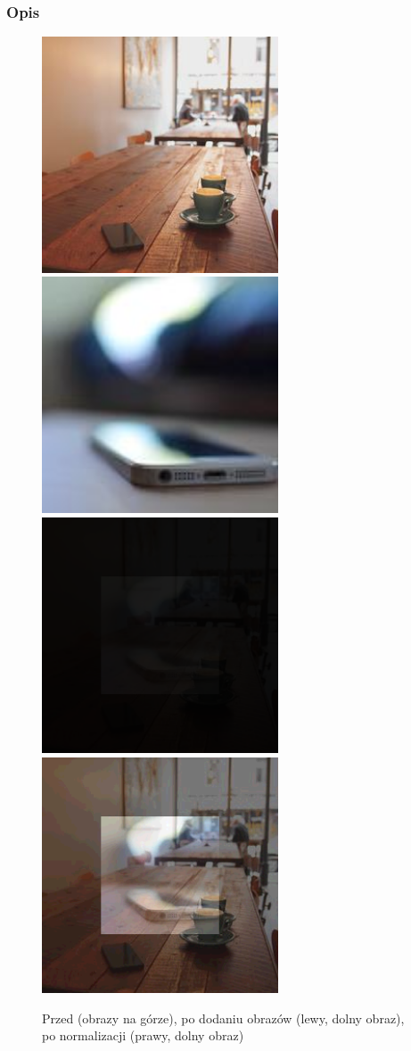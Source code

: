 \documentclass[a4paper,12pt]{book}
\begin{document}
\subsubsection*{Opis}
\begin{figure}[H]
	\caption{Przed (obrazy na górze), po dodaniu obrazów (lewy, dolny obraz), po normalizacji (prawy, dolny obraz)}
	\includegraphics[width=7cm, height=7cm]{coffee-unmodified.jpg}
	\includegraphics[width=7cm, height=7cm]{phone-unmodified.jpg}
	\includegraphics[width=7cm, height=7cm]{3-1/sum-color-images-coffee-phone.png}
	\includegraphics[width=7cm, height=7cm]{3-1/sum-color-images-coffee-phone-norm.png}

\end{figure}
\end{document}
